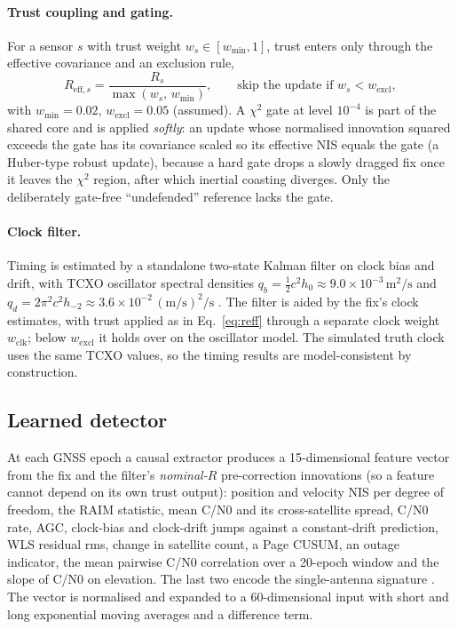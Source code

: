 \documentclass[12pt,a4paper]{article}
\begin{document}
\paragraph{Trust coupling and gating.}
For a sensor $s$ with trust weight $w_s\in[w_{\min},1]$, trust enters only through the effective covariance and an exclusion rule,
\begin{equation}
R_{\mathrm{eff},s} = \frac{R_s}{\max(w_s,\,w_{\min})},\qquad \text{skip the update if } w_s < w_{\mathrm{excl}},
\label{eq:reff}
\end{equation}
with $w_{\min}=0.02$, $w_{\mathrm{excl}}=0.05$ (assumed). A $\chi^2$ gate at level $10^{-4}$ is part of the shared core and is applied \emph{softly}: an update whose normalised innovation squared exceeds the gate has its covariance scaled so its effective NIS equals the gate (a Huber-type robust update), because a hard gate drops a slowly dragged fix once it leaves the $\chi^2$ region, after which inertial coasting diverges. Only the deliberately gate-free ``undefended'' reference lacks the gate.

\paragraph{Clock filter.}
Timing is estimated by a standalone two-state Kalman filter on clock bias and drift, with TCXO oscillator spectral densities $q_b = \tfrac12 c^2 h_0\approx 9.0\times10^{-3}\,\mathrm{m^2/s}$ and $q_d = 2\pi^2 c^2 h_{-2}\approx3.6\times10^{-2}\,(\mathrm{m/s})^2/\mathrm{s}$ \cite{brown2012introduction,krawinkel2021improved,qin2021benefits}. The filter is aided by the fix's clock estimates, with trust applied as in Eq.~\eqref{eq:reff} through a separate clock weight $w_{\mathrm{clk}}$; below $w_{\mathrm{excl}}$ it holds over on the oscillator model. The simulated truth clock uses the same TCXO values, so the timing results are model-consistent by construction.

\subsection{Learned detector}
\label{sec:detector}
At each GNSS epoch a causal extractor produces a 15-dimensional feature vector from the fix and the filter's \emph{nominal-$R$} pre-correction innovations (so a feature cannot depend on its own trust output): position and velocity NIS per degree of freedom, the RAIM statistic, mean C/N0 and its cross-satellite spread, C/N0 rate, AGC, clock-bias and clock-drift jumps against a constant-drift prediction, WLS residual rms, change in satellite count, a Page CUSUM, an outage indicator, the mean pairwise C/N0 correlation over a 20-epoch window and the slope of C/N0 on elevation. The last two encode the single-antenna signature \cite{rados2024recent}. The vector is normalised and expanded to a 60-dimensional input with short and long exponential moving averages and a difference term.
\end{document}
